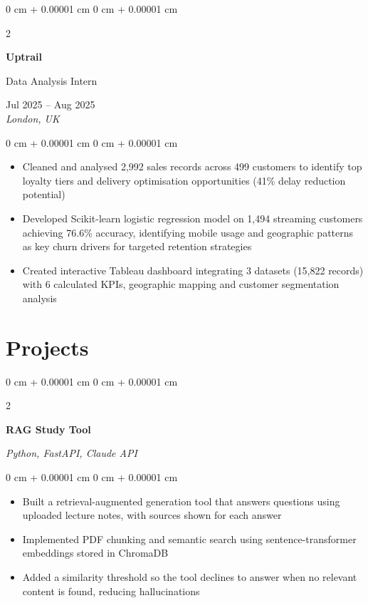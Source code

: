 \documentclass[10pt, a4paper]{article}
\newenvironment{highlights}{
    \begin{itemize}[
        topsep=0.10 cm,
        parsep=0.10 cm,
        partopsep=0pt,
        itemsep=0pt,
        leftmargin=20pt
    ]
}{
    \end{itemize}
} %
\newenvironment{onecolentry}{
    \begin{adjustwidth}{
        0 cm + 0.00001 cm
    }{
        0 cm + 0.00001 cm
    }
}{
    \end{adjustwidth}
} %
\newenvironment{twocolentry}[2][]{
    \onecolentry
    \def\secondColumn{#2}
    \setcolumnwidth{\fill, 4.5 cm}
    \begin{paracol}{2}
}{
    \switchcolumn \raggedleft \secondColumn
    \end{paracol}
    \endonecolentry
} %
\begin{document}
    \vspace{0.15 cm}

    \begin{twocolentry}{
        Jul 2025 -- Aug 2025 \\
        \textit{London, UK}
    }
        \textbf{Uptrail}
        
        Data Analysis Intern
    \end{twocolentry}

    \vspace{0.10 cm}
    \begin{onecolentry}
        \begin{highlights}
            \item Cleaned and analysed 2,992 sales records across 499 customers to identify top loyalty tiers and delivery optimisation opportunities (41\% delay reduction potential)
            \item Developed Scikit-learn logistic regression model on 1,494 streaming customers achieving 76.6\% accuracy, identifying mobile usage and geographic patterns as key churn drivers for targeted retention strategies
            \item Created interactive Tableau dashboard integrating 3 datasets (15,822 records) with 6 calculated KPIs, geographic mapping and customer segmentation analysis
        \end{highlights}
    \end{onecolentry}

    \vspace{0.15 cm}

    \section{Projects}


    \begin{twocolentry}{
        \textit{Python, FastAPI, Claude API}
    }
        \textbf{RAG Study Tool}
    \end{twocolentry}

    \vspace{0.10 cm}
    \begin{onecolentry}
        \begin{highlights}
            \item Built a retrieval-augmented generation tool that answers questions using uploaded lecture notes, with sources shown for each answer
            \item Implemented PDF chunking and semantic search using sentence-transformer embeddings stored in ChromaDB
            \item Added a similarity threshold so the tool declines to answer when no relevant content is found, reducing hallucinations
        \end{highlights}
    \end{onecolentry}
\end{document}
